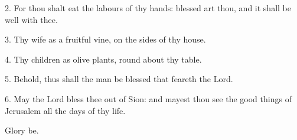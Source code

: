 
2. For thou shalt eat the labours of thy hands: blessed art thou, and it shall be well with thee.

3. Thy wife as a fruitful vine, on the sides of thy house.

4. Thy children as olive plants, round about thy table.

5. Behold, thus shall the man be blessed that feareth the Lord.

6. May the Lord bless thee out of Sion: and mayest thou see the good things of Jerusalem all the days of thy life.

Glory be.